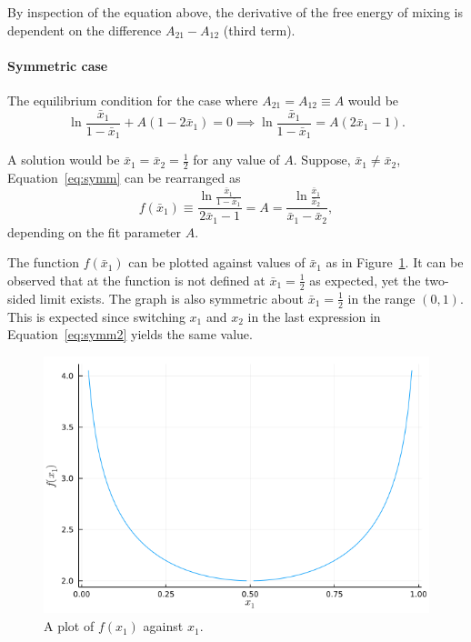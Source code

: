 By inspection of the equation above, the derivative of the free energy of
mixing is dependent on the difference $A_{21} - A_{12}$ (third term). 

\paragraph{Symmetric case}
The equilibrium condition for the case where $A_{21}=A_{12} \equiv A$ would be
\begin{equation}\label{eq:symm}
    \ln \dfrac{\bar x_1}{1-\bar x_1} + A(1 - 2\bar x_1) = 0 \implies
    \ln \dfrac{\bar x_1}{1-\bar x_1} = A(2\bar x_1 - 1).
\end{equation}

A solution would be $\bar x_1 = \bar x_2 = \frac12$ for any value of $A$. 
Suppose, $\bar x_1 \neq \bar x_2$, Equation~\ref{eq:symm} can be rearranged as
\begin{equation}\label{eq:symm2}
    f(\bar x_1) \equiv \dfrac{\ln \frac{\bar x_1}{1-\bar x_1}}{2\bar x_1 - 1} 
    = A = 
    \dfrac{\ln \frac{\bar x_1}{\bar x_2}}{\bar x_1 - \bar x_2},
\end{equation}
depending on the fit parameter $A$.

The function $f(\bar x_1)$ can be plotted against values of $\bar x_1$ as in 
Figure~\ref{fig:fx1}. It can be observed that at the function is not defined
at $\bar x_1 = \frac12$ as expected, yet the two-sided limit exists. The graph 
is also symmetric about $\bar x_1 = \frac12$ in the range $(0,1)$. This is 
expected since switching $x_1$ and $x_2$ in the last expression in 
Equation~\ref{eq:symm2} yields the same value.

\begin{figure}[ht]
    \centering
    \includegraphics[scale=0.5]{./figs/fx1.png}
    \caption{A plot of $f(x_1)$ against $x_1$.}
    \label{fig:fx1}
\end{figure}

